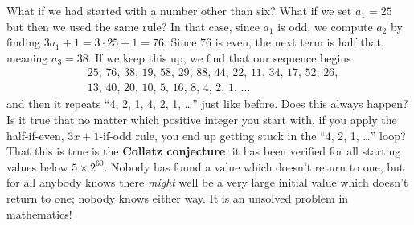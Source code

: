 \documentclass{ximera}
\begin{document}
\begin{exercise}
\begin{exercise}
\begin{exercise}
\begin{exercise}
\begin{exercise}
\begin{exercise}
  \end{exercise}
  What if we had started with a number other than six?  What if we set
  $a_1 = 25$ but then we used the same rule?  In that case, since
  $a_1$ is odd, we compute $a_2$ by finding $3 a_1 + 1 = 3 \cdot 25 +
  1 = 76$.  Since $76$ is even, the next term is half that, meaning
  $a_3 = 38$.  If we keep this up, we find that our sequence begins
  \begin{align*}
    &25,\, 76,\, 38,\, 19,\, 58,\, 29,\, 88,\, 44,\, 22,\, 11,\, 34,\, 17,\, 52,\, 26, \\
    &13,\, 40,\, 20,\, 10,\, 5,\, 16,\, 8,\, 4,\, 2, \, 1, \, \ldots
  \end{align*}
  and then it repeats ``4, 2, 1, 4, 2, 1, \ldots'' just like before.
  Does this always happen?  Is it true that no matter which positive
  integer you start with, if you apply the half-if-even, $3x+1$-if-odd
  rule, you end up getting stuck in the ``4, 2, 1, \ldots'' loop?
  That this is true is the \textbf{Collatz conjecture}; it has been
  verified for all starting values below $5 \times 2^{60}$.  Nobody
  has found a value which doesn't return to one, but for all anybody
  knows there \textit{might} well be a very large initial value which
  doesn't return to one; nobody knows either way.  It is an unsolved
  problem in mathematics!

\end{exercise}
  \end{exercise}
  \end{exercise}
  \end{exercise}
  \end{exercise}
\end{document}
